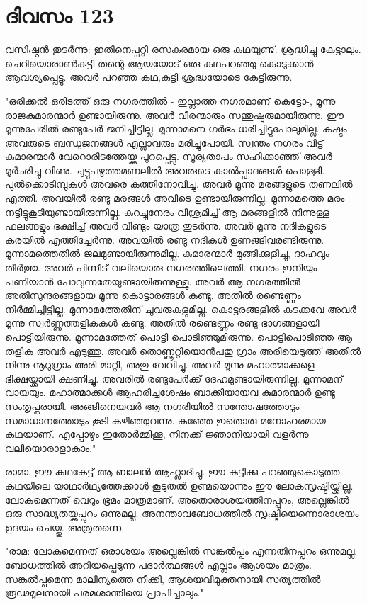  
\section{ദിവസം 123}


വസിഷ്ഠന്‍ തുടര്‍ന്നു: ഇതിനെപ്പറ്റി രസകരമായ ഒരു കഥയുണ്ട്‌. ശ്രദ്ധിച്ചു കേട്ടാലും. ചെറിയൊരാണ്‍കുട്ടി തന്റെ ആയയോട്‌ ഒരു കഥപറഞ്ഞു കൊടുക്കാന്‍ ആവശ്യപ്പെട്ടു. അവര്‍ പറഞ്ഞ കഥ,കുട്ടി ശ്രദ്ധയോടെ കേട്ടിരുന്നു.

"ഒരിക്കല്‍ ഒരിടത്ത്‌ ഒരു നഗരത്തില്‍ - ഇല്ലാത്ത നഗരമാണ്‌ കെട്ടോ-, മൂന്നു രാജകുമാരന്മാര്‍ ഉണ്ടായിരുന്നു. അവര്‍ വീരന്മാരും സന്തുഷ്ടരുമായിരുന്നു. ഈ മൂന്നുപേരില്‍ രണ്ടുപേര്‍ ജനിച്ചിട്ടില്ല. മൂന്നാമനെ ഗര്‍ഭം ധരിച്ചിട്ടുപോലുമില്ല. കഷ്ടം അവരുടെ ബന്ധുജനങ്ങള്‍ എല്ലാവരും മരിച്ചുപോയി. സ്വന്തം നഗരം വിട്ട്‌ കുമാരന്മാര്‍ വേറൊരിടത്തേയ്ക്കു പുറപ്പെട്ടു. സൂര്യതാപം സഹിക്കാഞ്ഞ്‌ അവര്‍ മൂര്‍ഛിച്ചു വിണു. ചുട്ടുപഴുത്തമണലില്‍ അവരുടെ കാല്‍പ്പാദങ്ങള്‍ പൊള്ളി. പുല്‍ക്കൊടിമ്പുകള്‍ അവരെ കുത്തിനോവിച്ചു. അവര്‍ മൂന്നു മരങ്ങളുടെ തണലില്‍ എത്തി. അവയില്‍ രണ്ടു മരങ്ങള്‍ അവിടെ ഉണ്ടായിരുന്നില്ല. മൂന്നാമത്തെ മരം നട്ടിട്ടുകൂടിയുണ്ടായിരുന്നില്ല. കുറച്ചുനേരം വിശ്രമിച്ച്‌ ആ മരങ്ങളില്‍ നിന്നുള്ള ഫലങ്ങളും ഭക്ഷിച്ച്‌ അവര്‍ വീണ്ടും യാത്ര തുടര്‍ന്നു. അവര്‍ മൂന്നു നദികളുടെ കരയില്‍ എത്തിച്ചേര്‍ന്നു. അവയില്‍ രണ്ടു നദികള്‍ ഉണങ്ങിവരണ്ടിരുന്നു. മൂന്നാമത്തെതില്‍ ജലമുണ്ടായിരുന്നുമില്ല. കുമാരന്മാര്‍ മുങ്ങിക്കുളിച്ചു, ദാഹവും തീര്‍ത്തു.  അവര്‍ പിന്നീട്‌ വലിയൊരു നഗരത്തിലെത്തി. നഗരം ഇനിയും പണിയാന്‍ പോവുന്നതേയുണ്ടായിരുന്നുള്ളു. അവര്‍ ആ നഗരത്തില്‍ അതിസുന്ദരങ്ങളായ മൂന്നു കൊട്ടാരങ്ങള്‍ കണ്ടു. അതില്‍ രണ്ടെണ്ണം നിര്‍മ്മിച്ചിട്ടില്ല. മൂന്നാമത്തേതിന്‌ ചുവരുകളുമില്ല. കൊട്ടരങ്ങളില്‍ കടക്കവേ അവര്‍ മൂന്നു സ്വര്‍ണ്ണത്തളികകള്‍ കണ്ടു. അതില്‍ രണ്ടെണ്ണം രണ്ടു ഭാഗങ്ങളായി പൊട്ടിയിരുന്നു. മൂന്നാമത്തേത്‌ പൊട്ടി പൊടിഞ്ഞുമിരുന്നു. പൊട്ടിപൊടിഞ്ഞ ആ തളിക അവര്‍ എടുത്തു. അവര്‍ തൊണ്ണൂറ്റിയൊന്‍പതു ഗ്രാം അരിയെടുത്ത്‌ അതില്‍ നിന്നു നൂറുഗ്രാം അരി മാറ്റി, അതു വേവിച്ചു. അവര്‍ മൂന്നു മഹാത്മാക്കളെ ഭിക്ഷയ്ക്കായി ക്ഷണിച്ചു. അവരില്‍ രണ്ടുപേര്‍ക്ക്‌ ദേഹമുണ്ടായിരുന്നില്ല. മൂന്നാമന്‌ വായയും. മഹാത്മാക്കള്‍ ആഹരിച്ചശേഷം ബാക്കിയായവ കുമാരന്മാര്‍ ഉണ്ടു സംതൃപ്തരായി. അങ്ങിനെയവര്‍ ആ നഗരിയില്‍ സന്തോഷത്തോടും സമാധാനത്തോടും കൂടി കഴിഞ്ഞുവന്നു. കുഞ്ഞേ ഇതൊരു മനോഹരമായ കഥയാണ്‌. എപ്പോഴും ഇതോര്‍മ്മിക്കൂ, നിനക്ക്‌ ജ്ഞാനിയായി വളര്‍ന്നു വലിയൊരാളാകാം."

രാമാ, ഈ കഥകേട്ട്‌ ആ ബാലന്‍ ആഹ്ലാദിച്ചു. ഈ കുട്ടിക്കു പറഞ്ഞുകൊടുത്ത കഥയിലെ യാഥാര്‍ഥ്യത്തേക്കാള്‍ കൂടുതല്‍ ഉണ്മയൊന്നും ഈ ലോകസൃഷ്ടിയ്ക്കില്ല. ലോകമെന്നത്‌ വെറും ഭ്രമം മാത്രമാണ്‌. അതൊരാശയത്തിനപ്പുറം, അല്ലെങ്കില്‍ ഒരു സാദ്ധ്യതയ്ക്കപ്പുറം  ഒന്നുമല്ല. അനന്താവബോധത്തില്‍ സൃഷ്ടിയെന്നൊരാശയം ഉദയം ചെയ്തു. അത്രതന്നെ.

"രാമ: ലോകമെന്നത്‌ ഒരാശയം അല്ലെങ്കില്‍ സങ്കല്‍പ്പം  എന്നതിനപ്പുറം ഒന്നുമല്ല. ബോധത്തില്‍ അറിയപ്പെടുന്ന പദാര്‍ത്ഥങ്ങള്‍ എല്ലാം ആശയം മാത്രം. സങ്കല്‍പ്പമെന്ന മാലിന്യത്തെ നീക്കി, ആശയവിമുക്തനായി സത്യത്തില്‍ രൂഢമൂലനായി പരമശാന്തിയെ പ്രാപിച്ചാലും." 
